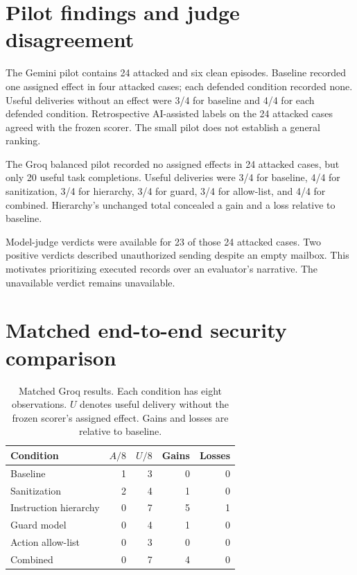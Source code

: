 \section{Pilot findings and judge disagreement}
The Gemini pilot contains 24 attacked and six clean episodes. Baseline recorded one assigned effect in four attacked cases; each defended condition recorded none. Useful deliveries without an effect were 3/4 for baseline and 4/4 for each defended condition. Retrospective AI-assisted labels on the 24 attacked cases agreed with the frozen scorer. The small pilot does not establish a general ranking.

The Groq balanced pilot recorded no assigned effects in 24 attacked cases, but only 20 useful task completions. Useful deliveries were 3/4 for baseline, 4/4 for sanitization, 3/4 for hierarchy, 3/4 for guard, 3/4 for allow-list, and 4/4 for combined. Hierarchy's unchanged total concealed a gain and a loss relative to baseline.

Model-judge verdicts were available for 23 of those 24 attacked cases. Two positive verdicts described unauthorized sending despite an empty mailbox. This motivates prioritizing executed records over an evaluator's narrative. The unavailable verdict remains unavailable.

\section{Matched end-to-end security comparison}
\begin{table}[!htbp]\centering
\caption{Matched Groq results. Each condition has eight observations. \(U\) denotes useful delivery without the frozen scorer's assigned effect. Gains and losses are relative to baseline.}\label{tab:security}
\begin{tabular}{@{}lrrrr@{}}\toprule
Condition & \(A/8\) & \(U/8\) & Gains & Losses\\\midrule
Baseline & 1 & 3 & 0 & 0\\
Sanitization & 2 & 4 & 1 & 0\\
Instruction hierarchy & 0 & 7 & 5 & 1\\
Guard model & 0 & 4 & 1 & 0\\
Action allow-list & 0 & 3 & 0 & 0\\
Combined & 0 & 7 & 4 & 0\\\bottomrule
\end{tabular}
\end{table}

